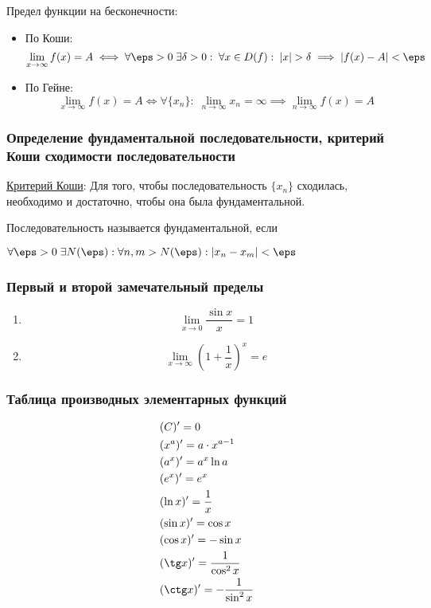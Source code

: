 \documentclass[12pt, a4paper]{article}
\begin{document}
	Предел функции на бесконечности:
	\begin{itemize}
		\item
		По Коши:
		\begin{equation*}
			\lim_{x \to \infty} f(x) = A \iff
			\forall \eps > 0 \; \exists \delta > 0: \; \forall x \in D(f): \; |x| > \delta \implies |f(x) - A| < \eps
		\end{equation*}

		\item
		По Гейне:
		\begin{equation*}
			\lim_{x \to \infty} f(x) = A \iff
			\forall \{x_n\}: \; \lim_{n \to \infty} x_n = \infty \implies
			\lim_{n \to \infty} f(x) = A
		\end{equation*}
	\end{itemize}

	\subsubsection{Определение фундаментальной последовательности, критерий Коши сходимости последовательности}
	\underline{Критерий Коши}: Для того, чтобы последовательность $\{x_n\}$ сходилась, необходимо и достаточно, чтобы она была фундаментальной.

	Последовательность называется фундаментальной, если 

	$\forall \eps > 0 \; \exists N(\eps): \forall n, m > N(\eps): |x_n - x_m| < \eps$

	\subsubsection{Первый и второй замечательный пределы}
	\begin{enumerate}
		\item
		\begin{equation*}
			\lim_{x \to 0} \dfrac{\sin x}{x} = 1
		\end{equation*}

		\item
		\begin{equation*}
			\lim_{x \to \infty} \left(1 + \dfrac{1}{x}\right)^x = e
		\end{equation*}
	\end{enumerate}

	\subsubsection{Таблица производных элементарных функций}
	\begin{align*}
		&(C)' = 0 \\
		&(x^a)' = a \cdot x^{a - 1} \\
		&(a^x)' = a^x \ln a \\
		&(e^x)' = e^x \\ 
		&(\ln x)' = \dfrac{1}{x} \\
		&(\sin x)' = \cos x \\
		&(\cos x)' = - \sin x \\
		&(\tg x)' = \dfrac{1}{\cos^2 x} \\
		&(\ctg x)' = -\dfrac{1}{\sin^2 x} \\
	\end{align*}
\end{document}
